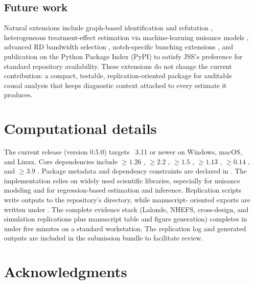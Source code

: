 \documentclass[article]{jss}
\begin{document}
\subsection{Future work}\label{sec:future}

Natural extensions include graph-based identification and refutation
\citep{Pearl2009,Imbens2020}, heterogeneous treatment-effect estimation
via machine-learning nuisance models
\citep{ChernozhukovEtAl2018,BattocchiEtAl2019}, advanced RD bandwidth
selection \citep{CalonicoCattaneoFarrell2020,ImbensKalyanaraman2012},
notch-specific bunching extensions \citep{Kleven2016}, and publication on
the Python Package Index (PyPI) to satisfy JSS's preference for standard
repository availability. These extensions do not change the current
contribution: a compact, testable, replication-oriented 
package for auditable causal analysis that keeps diagnostic context attached
to every estimate it produces.



\section*{Computational details}

The current release (version 0.5.0) targets ~3.11 or newer
on Windows, macOS, and Linux. Core dependencies include
 $\geq 1.26$ \citep{NumPyEtAl2020},
 $\geq 2.2$ \citep{McKinney2010},
 $\geq 1.5$ \citep{PedregosaEtAl2011},
 $\geq 1.13$ \citep{VirtanenEtAl2020},
 $\geq 0.14$ \citep{SeaboldPerktold2010}, and
 $\geq 3.9$ \citep{Hunter2007}. Package metadata and dependency constraints are
declared in . The implementation relies on
widely used scientific  libraries, especially
 for nuisance modeling and  for
regression-based estimation and inference.
Replication scripts write outputs to
the repository's  directory, while manuscript-
oriented exports are written under .
The complete evidence stack (Lalonde, NHEFS, cross-design, and simulation
replications plus manuscript table and figure generation) completes in under
five minutes on a standard workstation. The replication log and generated
outputs are included in the submission bundle to facilitate review.


\section*{Acknowledgments}
\end{document}
